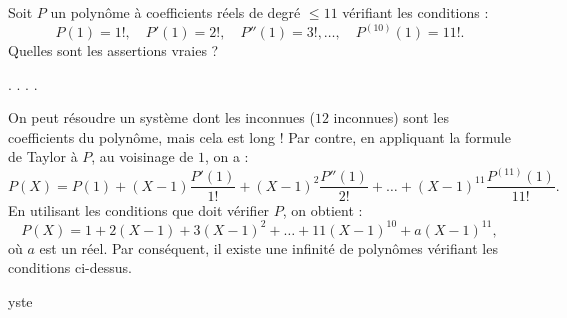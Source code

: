 \begin{question}
Soit $P$ un polynôme à coefficients réels de degré $\le 11$ vérifiant les conditions : 
$$P(1)=1!,\quad P'(1)=2!,\quad P''(1)=3!, \dots , \quad
P^{(10)}(1)= 11!.$$
Quelles sont les assertions vraies ?
\begin{answers}  
.
.
.
.
\end{answers}
\begin{explanations} On peut résoudre un système dont les inconnues ($12$ inconnues) sont les coefficients du polynôme, mais cela est long ! Par contre, en appliquant la formule de Taylor à $P$, au voisinage de $1$,  on a :
$$P(X)=P(1)+(X-1)\frac{P'(1)}{1!} + (X-1)^2\frac{P''(1)}{2!}+ \dots + (X-1)^{11}\frac{P^{(11)}(1)}{11!}.$$
En utilisant les conditions que doit vérifier $P$, on obtient :
$$P(X)=1+2(X-1)+ 3(X-1)^2+ \dots + 11(X-1)^{10} +  a(X-1)^{11},$$
où $a$ est un réel. Par conséquent, il existe une infinité de polynômes vérifiant les conditions ci-dessus.
\end{explanations}
\end{question}
yste
